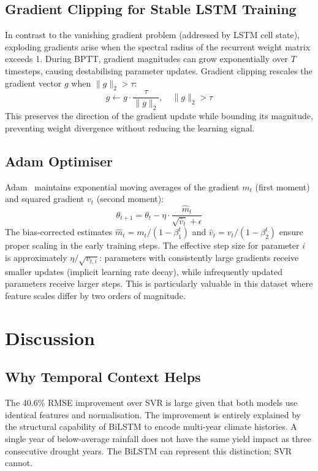 \documentclass[conference]{IEEEtran}
\begin{document}
\subsection{Gradient Clipping for Stable LSTM Training}
In contrast to the vanishing gradient problem (addressed by LSTM cell state),
exploding gradients arise when the spectral radius of the recurrent weight matrix
exceeds 1.
During BPTT, gradient magnitudes can grow exponentially over $T$ timesteps,
causing destabilising parameter updates.
Gradient clipping rescales the gradient vector $g$ when $\|g\|_2 > \tau$:
\begin{equation}
    g \leftarrow g \cdot \frac{\tau}{\|g\|_2}, \quad \|g\|_2 > \tau
\end{equation}
This preserves the direction of the gradient update while bounding its magnitude,
preventing weight divergence without reducing the learning signal.

\subsection{Adam Optimiser}
Adam~\cite{kingma2014} maintains exponential moving averages of the gradient
$m_t$ (first moment) and squared gradient $v_t$ (second moment):
\begin{equation}
    \theta_{t+1} = \theta_t - \eta \cdot
    \frac{\hat{m}_t}{\sqrt{\hat{v}_t} + \epsilon}
\end{equation}
The bias-corrected estimates $\hat{m}_t = m_t/(1-\beta_1^t)$ and
$\hat{v}_t = v_t/(1-\beta_2^t)$ ensure proper scaling in the early training steps.
The effective step size for parameter $i$ is approximately $\eta / \sqrt{v_{t,i}}$:
parameters with consistently large gradients receive smaller updates (implicit
learning rate decay), while infrequently updated parameters receive larger steps.
This is particularly valuable in this dataset where feature scales differ by
two orders of magnitude.

\section{Discussion}
\label{sec:discussion}

\subsection{Why Temporal Context Helps}
The 40.6\% RMSE improvement over SVR is large given that both models use identical
features and normalisation.
The improvement is entirely explained by the structural capability of BiLSTM to
encode multi-year climate histories.
A single year of below-average rainfall does not have the same yield impact as
three consecutive drought years.
The BiLSTM can represent this distinction; SVR cannot.
\end{document}
